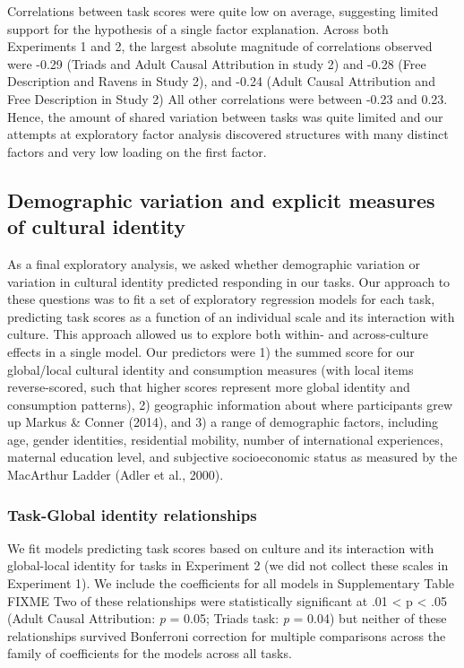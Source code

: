 \documentclass[
  man,floatsintext]{apa6}
\begin{document}
Correlations between task scores were quite low on average, suggesting limited support for the hypothesis of a single factor explanation. Across both Experiments 1 and 2, the largest absolute magnitude of correlations observed were -0.29 (Triads and Adult Causal Attribution in study 2) and -0.28 (Free Description and Ravens in Study 2), and -0.24 (Adult Causal Attribution and Free Description in Study 2) All other correlations were between -0.23 and 0.23. Hence, the amount of shared variation between tasks was quite limited and our attempts at exploratory factor analysis discovered structures with many distinct factors and very low loading on the first factor.

\hypertarget{demographic-variation-and-explicit-measures-of-cultural-identity}{%
\subsection{Demographic variation and explicit measures of cultural identity}\label{demographic-variation-and-explicit-measures-of-cultural-identity}}

As a final exploratory analysis, we asked whether demographic variation or variation in cultural identity predicted responding in our tasks. Our approach to these questions was to fit a set of exploratory regression models for each task, predicting task scores as a function of an individual scale and its interaction with culture. This approach allowed us to explore both within- and across-culture effects in a single model. Our predictors were 1) the summed score for our global/local cultural identity and consumption measures (with local items reverse-scored, such that higher scores represent more global identity and consumption patterns), 2) geographic information about where participants grew up Markus \& Conner (2014), and 3) a range of demographic factors, including age, gender identities, residential mobility, number of international experiences, maternal education level, and subjective socioeconomic status as measured by the MacArthur Ladder (Adler et al., 2000).

\hypertarget{task-global-identity-relationships}{%
\subsubsection{Task-Global identity relationships}\label{task-global-identity-relationships}}

We fit models predicting task scores based on culture and its interaction with global-local identity for tasks in Experiment 2 (we did not collect these scales in Experiment 1). We include the coefficients for all models in Supplementary Table FIXME Two of these relationships were statistically significant at .01 \textless{} p \textless{} .05 (Adult Causal Attribution: \emph{p} = 0.05; Triads task: \emph{p} = 0.04) but neither of these relationships survived Bonferroni correction for multiple comparisons across the family of coefficients for the models across all tasks.
\end{document}
